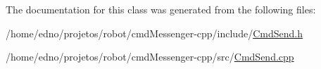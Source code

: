 The documentation for this class was generated from the following files\+:\begin{DoxyCompactItemize}
\item 
/home/edno/projetos/robot/cmd\+Messenger-\/cpp/include/\hyperlink{_cmd_send_8h}{Cmd\+Send.\+h}\item 
/home/edno/projetos/robot/cmd\+Messenger-\/cpp/src/\hyperlink{_cmd_send_8cpp}{Cmd\+Send.\+cpp}\end{DoxyCompactItemize}
